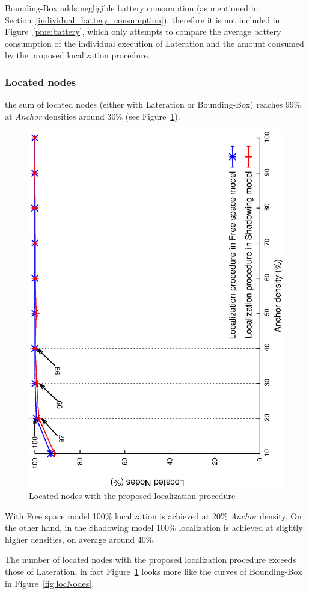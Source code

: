 Bounding-Box adds negligible battery consumption (as mentioned in Section~\ref{individual_battery_consumption}), therefore it is not included in Figure~\ref{pme:battery}, which only attempts to compare the average battery consumption of the individual execution of Lateration and the amount consumed by the proposed localization procedure.

\subsubsection{Located nodes}\label{locProc_locatedNodes}
the sum of located nodes (either with Lateration or Bounding-Box) reaches 99\% at \emph{Anchor} densities around 30\% (see Figure~\ref{pme:locNodes}).

\begin{figure}[tb]
  \centering
  \includegraphics[width=0.7\linewidth, angle = -90]{section4/figures/pmeLocNodes.eps}
  \caption{Located nodes with the proposed localization procedure
  \label{pme:locNodes}}
\end{figure}

With Free space model 100\% localization is achieved at 20\% \emph{Anchor} density. On the other hand, in the Shadowing model 100\% localization is achieved at slightly higher densities, on average around 40\%.

The number of located nodes with the proposed localization procedure exceeds those of Lateration, in fact Figure~\ref{pme:locNodes} looks more like the curves of Bounding-Box in Figure~\ref{fig:locNodes}.

